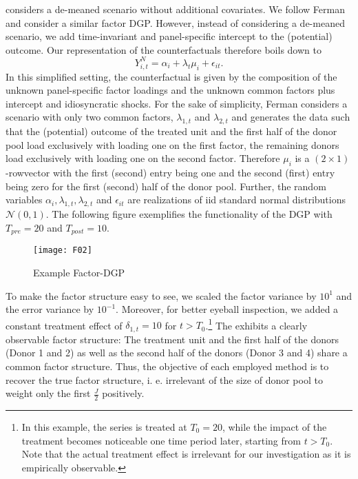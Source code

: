 \cite{ferman:2021} considers a de-meaned scenario without additional covariates. 
We follow Ferman and consider a similar factor \ac{DGP}. However, instead of considering a de-meaned scenario, we add time-invariant and panel-specific intercept to the (potential) outcome. Our representation of the counterfactuals therefore boils down to 
\begin{equation*}
	Y_{i,t}^{N} = \alpha_i + \lambda_t \mu_i + \epsilon_{it}.
\end{equation*}
In this simplified setting, the counterfactual is given by the composition of the unknown panel-specific factor loadings and the unknown common factors plus intercept and idiosyncratic shocks. For the sake of simplicity, Ferman considers a scenario with only two common factors, $\lambda_{1,t}$ and $\lambda_{2,t}$ and generates the data such that the (potential) outcome of the treated unit and the first half of the donor pool load exclusively with loading one on the first factor, the remaining donors load exclusively with loading one on the second factor. Therefore $\mu_i$ is a $(2 \times 1)$-rowvector with the first (second) entry being one and the second (first) entry being zero for the first (second) half of the donor pool. Further, the random variables $\alpha_i, \lambda_{1,t}, \lambda_{2,t}$ and $\epsilon_{it}$ are realizations of \ac{iid} standard normal distributions $\mathcal{N}(0,1)$. The following figure exemplifies the functionality of the \ac{DGP} with $T_{pre} = 20$ and $T_{post} = 10$.
\begin{figure}[H]
	\centering
	\texttt{[image: F02]}
	\caption{Example Factor-\ac{DGP}}
	\label{F_02}
\end{figure}
To make the factor structure easy to see, we scaled the factor variance by $10^1$ and the error variance by $10^{-1}$. Moreover, for better eyeball inspection, we added a constant treatment effect of $\delta_{1,t} = 10$ for $t > T_0$.\footnote{In this example, the series is treated at $T_0 = 20$, while the impact of the treatment becomes noticeable one time period later, starting from $t > T_0$. Note that the actual treatment effect is irrelevant for our investigation as it is empirically observable.}  
The exhibits a clearly observable factor structure: The treatment unit and the first half of the donors (Donor 1 and 2) as well as the second half of the donors (Donor 3 and 4) share a common factor structure. Thus, the objective of each employed method is to recover the true factor structure, i. e. irrelevant of the size of donor pool to weight only the first $\frac{J}{2}$ positively.


